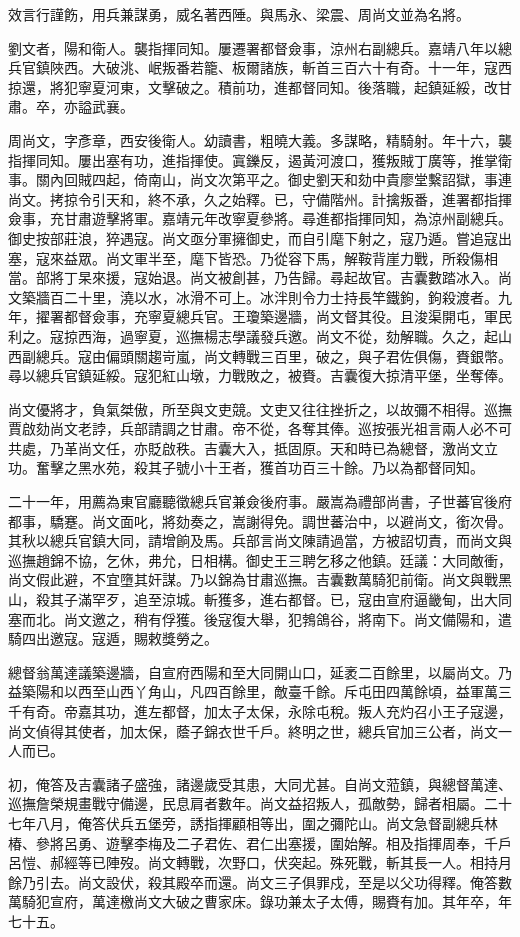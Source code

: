 \begin{pinyinscope}
效言行謹飭，用兵兼謀勇，威名著西陲。與馬永、梁震、周尚文並為名將。

劉文者，陽和衛人。襲指揮同知。屢遷署都督僉事，涼州右副總兵。嘉靖八年以總兵官鎮陜西。大破洮、岷叛番若籠、板爾諸族，斬首三百六十有奇。十一年，寇西掠還，將犯寧夏河東，文擊破之。積前功，進都督同知。後落職，起鎮延綏，改甘肅。卒，亦謚武襄。

周尚文，字彥章，西安後衛人。幼讀書，粗曉大義。多謀略，精騎射。年十六，襲指揮同知。屢出塞有功，進指揮使。寘鑠反，遏黃河渡口，獲叛賊丁廣等，推掌衛事。關內回賊四起，倚南山，尚文次第平之。御史劉天和劾中貴廖堂繫詔獄，事連尚文。拷掠令引天和，終不承，久之始釋。已，守備階州。計擒叛番，進署都指揮僉事，充甘肅遊擊將軍。嘉靖元年改寧夏參將。尋進都指揮同知，為涼州副總兵。御史按部莊浪，猝遇寇。尚文亟分軍擁御史，而自引麾下射之，寇乃遁。嘗追寇出塞，寇來益眾。尚文軍半至，麾下皆恐。乃從容下馬，解鞍背崖力戰，所殺傷相當。部將丁杲來援，寇始退。尚文被創甚，乃告歸。尋起故官。吉囊數踏冰入。尚文築牆百二十里，澆以水，冰滑不可上。冰泮則令力士持長竿鐵鉤，鉤殺渡者。九年，擢署都督僉事，充寧夏總兵官。王瓊築邊牆，尚文督其役。且浚渠開屯，軍民利之。寇掠西海，過寧夏，巡撫楊志學議發兵邀。尚文不從，劾解職。久之，起山西副總兵。寇由偏頭關趨岢嵐，尚文轉戰三百里，破之，與子君佐俱傷，賚銀幣。尋以總兵官鎮延綏。寇犯紅山墩，力戰敗之，被賚。吉囊復大掠清平堡，坐奪俸。

尚文優將才，負氣桀傲，所至與文吏競。文吏又往往挫折之，以故彌不相得。巡撫賈啟劾尚文老誖，兵部請調之甘肅。帝不從，各奪其俸。巡按張光祖言兩人必不可共處，乃革尚文任，亦貶啟秩。吉囊大入，抵固原。天和時已為總督，激尚文立功。奮擊之黑水苑，殺其子號小十王者，獲首功百三十餘。乃以為都督同知。

二十一年，用薦為東官廳聽徵總兵官兼僉後府事。嚴嵩為禮部尚書，子世蕃官後府都事，驕蹇。尚文面叱，將劾奏之，嵩謝得免。調世蕃治中，以避尚文，銜次骨。其秋以總兵官鎮大同，請增餉及馬。兵部言尚文陳請過當，方被詔切責，而尚文與巡撫趙錦不協，乞休，弗允，日相構。御史王三聘乞移之他鎮。廷議：大同敵衝，尚文假此避，不宜墮其奸謀。乃以錦為甘肅巡撫。吉囊數萬騎犯前衛。尚文與戰黑山，殺其子滿罕歹，追至涼城。斬獲多，進右都督。已，寇由宣府逼畿甸，出大同塞而北。尚文邀之，稍有俘獲。後寇復大舉，犯鵓鴿谷，將南下。尚文備陽和，遣騎四出邀寇。寇遁，賜敕獎勞之。

總督翁萬達議築邊牆，自宣府西陽和至大同開山口，延袤二百餘里，以屬尚文。乃益築陽和以西至山西丫角山，凡四百餘里，敵臺千餘。斥屯田四萬餘頃，益軍萬三千有奇。帝嘉其功，進左都督，加太子太保，永除屯稅。叛人充灼召小王子寇邊，尚文偵得其使者，加太保，蔭子錦衣世千戶。終明之世，總兵官加三公者，尚文一人而已。

初，俺答及吉囊諸子盛強，諸邊歲受其患，大同尤甚。自尚文蒞鎮，與總督萬達、巡撫詹榮規畫戰守備邊，民息肩者數年。尚文益招叛人，孤敵勢，歸者相屬。二十七年八月，俺答伏兵五堡旁，誘指揮顧相等出，圍之彌陀山。尚文急督副總兵林椿、參將呂勇、遊擊李梅及二子君佐、君仁出塞援，圍始解。相及指揮周奉，千戶呂愷、郝經等已陣歿。尚文轉戰，次野口，伏突起。殊死戰，斬其長一人。相持月餘乃引去。尚文設伏，殺其殿卒而還。尚文三子俱罪戍，至是以父功得釋。俺答數萬騎犯宣府，萬達檄尚文大破之曹家床。錄功兼太子太傅，賜賚有加。其年卒，年七十五。


\end{pinyinscope}
